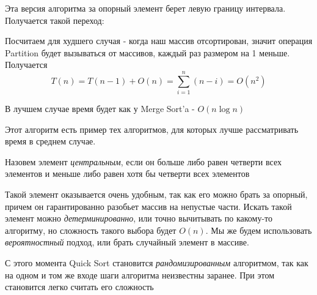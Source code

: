 \documentclass[../book.tex]{subfiles}
\begin{document}
	Эта версия алгоритма за опорный элемент берет левую границу интервала. Получается такой переход:
	
	\begin{center}
	\end{center}
	
	\begin{time}
		Посчитаем для худшего случая - когда наш массив отсортирован, значит операция Partition будет вызываться от массивов, каждый раз размером на 1 меньше. Получается 
		\[
		T(n) = T(n - 1) + O(n) = \sum_{i = 1}^n (n - i) = O(n^2)
		\]
		
		В лучшем случае время будет как у Merge Sort'a - $O(n\log n)$
	\end{time}
	
	Этот алгоритм есть пример тех алгоритмов, для которых лучше рассматривать время в среднем случае. 
		
	\begin{definition}
		Назовем элемент \textit{центральным}, если он больше либо равен четверти всех элементов и меньше либо равен хотя бы четверти всех элементов
	\end{definition}
	
	Такой элемент оказывается очень удобным, так как его можно брать за опорный, причем он гарантированно разобьет массив на непустые части. Искать такой элемент можно \textit{детерминированно}, или точно вычитывать по какому-то алгоритму, но сложность такого выбора будет $O(n)$. Мы же будем использовать \textit{вероятностный} подход, или брать случайный элемент в массиве. 
	
	С этого момента Quick Sort становится \textit{рандомизированным} алгоритмом, так как на одном и том же входе шаги алгоритма неизвестны заранее. При этом становится легко считать его сложность
	
\end{document}
